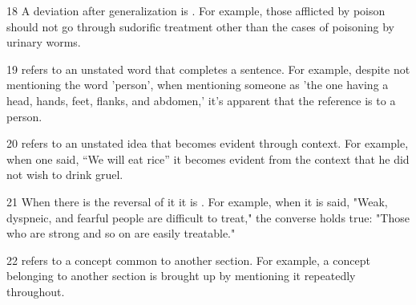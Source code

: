 \begin{translation}
\item [18] A deviation after generalization is . For example, those afflicted by poison should not go through sudorific treatment other than the cases of poisoning by urinary worms.

\item [19]  refers to an unstated word that completes a sentence. For example, despite not mentioning the word 'person', when mentioning someone as 'the one having a head, hands, feet, flanks, and abdomen,' it's apparent that the reference is to a person. 

\item [20]  refers to an unstated idea that becomes evident through context. For example, when one said, “We will eat rice” it becomes evident from the context that he did not wish to drink gruel. 

\item [21] When there is the reversal of it it is . For example, when it is said, "Weak, dyspneic, and fearful people are difficult to treat," the converse holds true: "Those who are strong and so on are easily treatable." 

\item [22]  refers to a concept common to another section. For example, a concept belonging to another section is brought up by mentioning it repeatedly throughout. 


\end{translation}
